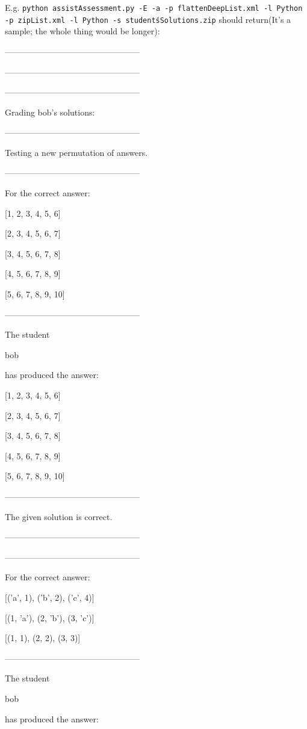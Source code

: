 \documentclass[a4paper,12pt]{article}
\begin{document}
\begin{itemize}
\begin{itemize}
   E.g. \texttt{python assistAssessment.py -E -a -p flattenDeepList.xml -l Python -p zipList.xml -l Python -s student\'sSolutions.zip} should return(It's a sample; the whole thing would be longer): 
   
------------------------------------------------

------------------------------------------------

------------------------------------------------

        Grading bob's solutions:

------------------------------------------------

Testing a new permutation of answers.

------------------------------------------------

For the correct answer:

[1, 2, 3, 4, 5, 6]

[2, 3, 4, 5, 6, 7]

[3, 4, 5, 6, 7, 8]

[4, 5, 6, 7, 8, 9]

[5, 6, 7, 8, 9, 10]

------------------------------------------------

The student

        bob

has produced the answer:

[1, 2, 3, 4, 5, 6]

[2, 3, 4, 5, 6, 7]

[3, 4, 5, 6, 7, 8]

[4, 5, 6, 7, 8, 9]

[5, 6, 7, 8, 9, 10]

------------------------------------------------

The given solution is correct.

------------------------------------------------

------------------------------------------------

For the correct answer:

[('a', 1), ('b', 2), ('c', 4)]

[(1, 'a'), (2, 'b'), (3, 'c')]

[(1, 1), (2, 2), (3, 3)]

------------------------------------------------

The student

        bob

has produced the answer:


\end{itemize}
\end{itemize}
\end{document}
